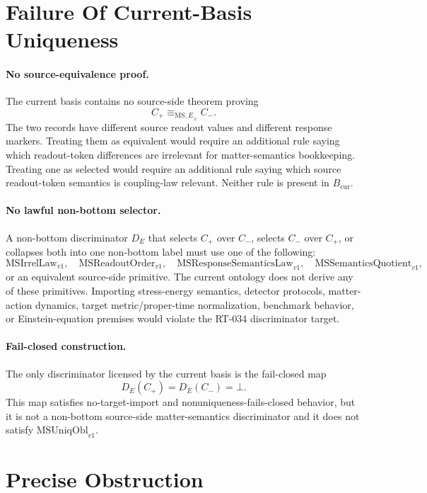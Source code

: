 \section{Failure Of Current-Basis Uniqueness}

\paragraph{No source-equivalence proof.}
The current basis contains no source-side theorem proving
\[
  C_+ \equiv_{\mathrm{MS},E_{\pm}} C_-.
\]
The two records have different source readout values and different response
markers.  Treating them as equivalent would require an additional rule saying
which readout-token differences are irrelevant for matter-semantics
bookkeeping.  Treating one as selected would require an additional rule saying
which source readout-token semantics is coupling-law relevant.  Neither rule
is present in \(B_{\mathrm{cur}}\).

\paragraph{No lawful non-bottom selector.}
A non-bottom discriminator \(D_E\) that selects \(C_+\) over \(C_-\), selects
\(C_-\) over \(C_+\), or collapses both into one non-bottom label must use one
of the following:
\[
  \mathrm{MSIrrelLaw}_{v1},\quad
  \mathrm{MSReadoutOrder}_{v1},\quad
  \mathrm{MSResponseSemanticsLaw}_{v1},\quad
  \mathrm{MSSemanticsQuotient}_{v1},
\]
or an equivalent source-side primitive.  The current ontology does not derive
any of these primitives.  Importing stress-energy semantics, detector
protocols, matter-action dynamics, target metric/proper-time normalization,
benchmark behavior, or Einstein-equation premises would violate the
RT-034 discriminator target.

\paragraph{Fail-closed construction.}
The only discriminator licensed by the current basis is the fail-closed map
\[
  D_E(C_+)=D_E(C_-)=\bot.
\]
This map satisfies no-target-import and nonuniqueness-fails-closed behavior,
but it is not a non-bottom source-side matter-semantics discriminator and it
does not satisfy \(\mathrm{MSUniqObl}_{v1}\).

\section{Precise Obstruction}


